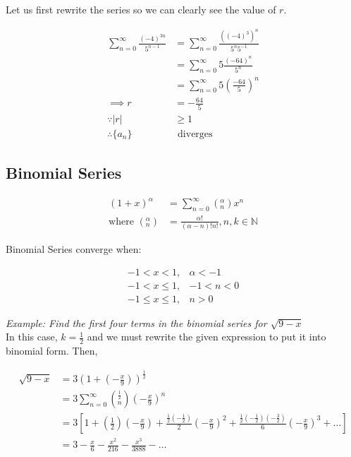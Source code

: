         \noindent Let us first rewrite the series so we can clearly see the value of $r$.

        \begin{align*}
            \sum^\infty_{n=0} \frac{(-4)^{3n}}{5^{n-1}} &= \sum^\infty_{n=0}
            \frac{\left((-4)^3\right)^n}{5^n 5^{-1}} \\
            &= \sum^\infty_{n=0} 5\frac{(-64)^n}{5^n} \\
            &= \sum^\infty_{n=0} 5 \left(\frac{-64}{5}\right)^n \\
            \implies r &= -\frac{64}{5} \\
            \because |r| & \geq 1 \\
            \therefore \{a_n\} & \text{ diverges}
        \end{align*}

    \subsection{Binomial Series}

        \begin{align*}
            (1+x)^\alpha                        &= \sum^\infty_{n=0}\left(^\alpha_n\right)x^n \\
            \text{where }\left(^\alpha_n\right) &= \frac{\alpha!}{(\alpha-n)!n!},n,k\in\mathbb{N}
        \end{align*}

        \noindent Binomial Series converge when:

        \begin{align*}
            -1<x<1,         & \alpha<-1 \\
            -1<x\leq1,      & -1<n<0 \\
            -1\leq x\leq 1, & n>0
        \end{align*}

        \noindent \color{blue} \textit{Example: Find the first four terms in the binomial series
        for $\sqrt{9-x}$} \color{black} \\

        \noindent In this case, $k=\frac{1}{2}$ and we must rewrite the given expression to put it
        into binomial form. Then,

        \begin{align*}
            \sqrt{9-x}  &= 3\left(1+\left(-\frac{x}{9}\right)\right)^\frac{1}{2} \\
                        &= 3\sum^\infty_{n=0}\left(^{\frac{1}{2}}_n\right)\left(-\frac{x}{9}\right)^n \\
                        &= 3\left[1+\left(\frac{1}{2}\right)\left(-\frac{x}{9}\right)
                         + \frac{\frac{1}{2}\left(-\frac{1}{2}\right)}{2}\left(-\frac{x}{9}\right)^2
                         + \frac{\frac{1}{2}\left(-\frac{1}{2}\right)\left(-\frac{3}{2}\right)}{6}
                          \left(-\frac{x}{9}\right)^3+\dots\right] \\
                        &= 3-\frac{x}{6}-\frac{x^2}{216}-\frac{x^3}{3888}-\dots
        \end{align*}


